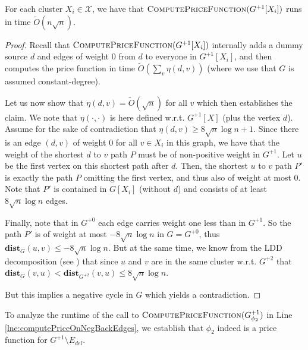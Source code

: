 \begin{claim}
For each cluster $X_i \in \mathcal{X}$, we have that $\textsc{ComputePriceFunction}(G^{+1}[X_i])$ runs in time $\tilde{O}(n \sqrt{n})$. 
\end{claim}
\begin{proof}
Recall that  $\textsc{ComputePriceFunction}(G^{+1}[X_i])$ internally adds a dummy source $d$ and edges of weight $0$ from $d$ to everyone in $G^{+1}[X_i]$, and then computes the price function in time $\tilde{O}(\sum_v \eta(d,v))$ (where we use that $G$ is assumed constant-degree).

Let us now show that $\eta(d,v) = \tilde{O}( \sqrt{n})$ for all $v$ which then establishes the claim. We note that $\eta(\cdot, \cdot)$ is here defined w.r.t. $G^{+1}[X]$ (plus the vertex $d$). Assume for the sake of contradiction that $\eta(d,v) \geq 8\sqrt{n} \log n + 1$. Since there is an edge $(d,v)$ of weight $0$ for all $v \in X_i$ in this graph, we have that the weight of the shortest $d$ to $v$ path $P$ must be of non-positive weight in $G^{+1}$. Let $u$ be the first vertex on this shortest path after $d$. Then, the shortest $u$ to $v$ path $P'$ is exactly the path $P$ omitting the first vertex, and thus also of weight at most $0$. Note that $P'$ is contained in $G[X_i]$ (without $d$) and consists of at least $8\sqrt{n} \log n$ edges. 

Finally, note that in $G^{+0}$ each edge carries weight one less than in $G^{+1}$. So the path $P'$ is of weight at most $-8\sqrt{n} \log n$ in $G = G^{+0}$, thus $\mathbf{dist}_G(u,v) \leq -8\sqrt{n} \log n$. But at the same time, we know from the LDD decomposition (see ) that since $u$ and $v$ are in the same cluster w.r.t. $G^{+2}$ that $\mathbf{dist}_{G}(v,u) < \mathbf{dist}_{G^{+2}}(v,u) \leq 8 \sqrt{n} \log n$. 

But this implies a negative cycle in $G$ which yields a contradiction.
\end{proof}

To analyze the runtime of the call to $ \textsc{ComputePriceFunction}(G^{+1}_{\phi_2})$ in Line \ref{lne:computePriceOnNegBackEdges}, we establish that $\phi_2$ indeed is a price function for $G^{+1} \setminus E_{del}$. 

